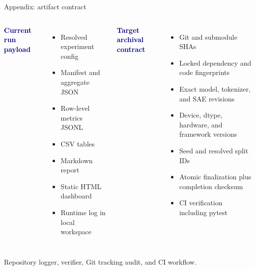 \documentclass[aspectratio=169,10pt]{beamer}
\newenvironment{tightitemize}{%
  \begin{itemize}\setlength\itemsep{0.38em}\setlength\parskip{0pt}%
}{\end{itemize}}
\newcommand{\source}[1]{\vfill{\scriptsize\color{Gray}#1}}
\begin{document}
\begin{frame}{Appendix: artifact contract}
\small
\begin{columns}[T,onlytextwidth]
\textcolor{Navy}{\bfseries Current run payload}
\begin{tightitemize}
  \item Resolved experiment config
  \item Manifest and aggregate JSON
  \item Row-level metrics JSONL
  \item CSV tables
  \item Markdown report
  \item Static HTML dashboard
  \item Runtime log in local workspace
\end{tightitemize}

\textcolor{Navy}{\bfseries Target archival contract}
\begin{tightitemize}
  \item Git and submodule SHAs
  \item Locked dependency and code fingerprints
  \item Exact model, tokenizer, and SAE revisions
  \item Device, dtype, hardware, and framework versions
  \item Seed and resolved split IDs
  \item Atomic finalization plus completion checksum
  \item CI verification including pytest
\end{tightitemize}
\end{columns}

\source{Repository logger, verifier, Git tracking audit, and CI workflow.}
\end{frame}
\end{document}

